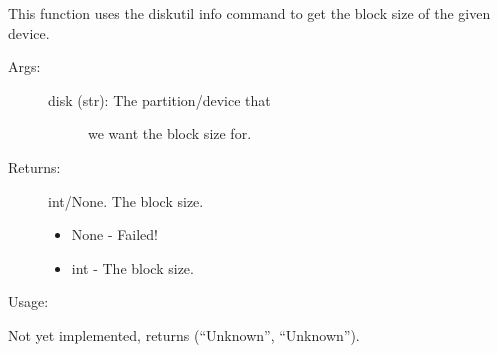 \documentclass[letterpaper,10pt,english]{sphinxmanual}
\begin{document}
\begin{fulllineitems}
\label{\detokenize{macos:getdevinfo.macos.get_block_size}}

This function uses the diskutil info command to get the block size
of the given device.
\begin{description}
\item[{Args:}] \leavevmode\begin{description}
\item[{disk (str):     The partition/device that}] \leavevmode
we want the block size for.

\end{description}

\item[{Returns:}] \leavevmode
int/None. The block size.
\begin{itemize}
\item {} 
None - Failed!

\item {} 
int  - The block size.

\end{itemize}

\end{description}

Usage:

\begin{sphinxVerbatim}[commandchars=\\\{\}]
  
\end{sphinxVerbatim}

\end{fulllineitems}


\begin{fulllineitems}
\label{\detokenize{macos:getdevinfo.macos.get_boot_record}}
Not yet implemented, returns (“Unknown”, “Unknown”).

\end{fulllineitems}
\end{document}

